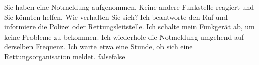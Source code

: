     {Sie haben eine Notmeldung aufgenommen. Keine andere Funkstelle reagiert und Sie könnten helfen. Wie verhalten Sie sich?}
    {Ich beantworte den Ruf und informiere die Polizei oder Rettungsleitstelle.}
    {Ich schalte mein Funkgerät ab, um keine Probleme zu bekommen.}
    {Ich wiederhole die Notmeldung umgehend auf derselben Frequenz.}
    {Ich warte etwa eine Stunde, ob sich eine Rettungsorganisation meldet.}
    {false}{false}